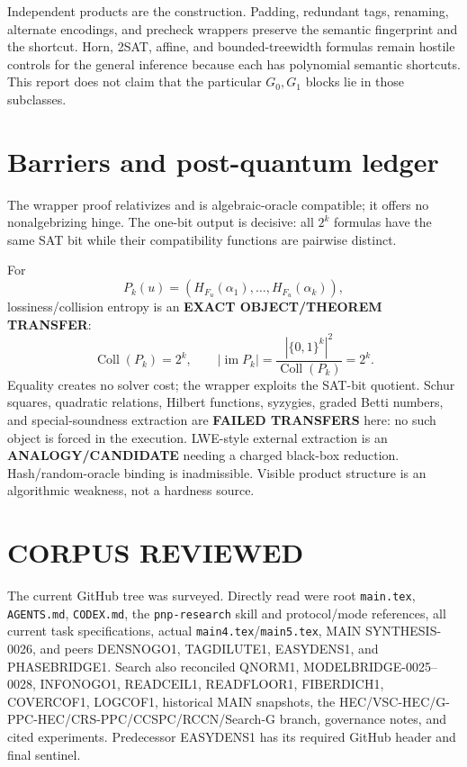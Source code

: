 \documentclass[11pt]{article}
\newcommand{\Status}[1]{\textbf{#1}}
\begin{document}
Independent products are the construction.  Padding, redundant tags,
renaming, alternate encodings, and precheck wrappers preserve the semantic
fingerprint and the shortcut.  Horn, 2SAT, affine, and bounded-treewidth
formulas remain hostile controls for the general inference because each has
polynomial semantic shortcuts.  This report does not claim that the particular
\(G_0,G_1\) blocks lie in those subclasses.

\section{Barriers and post-quantum ledger}
The wrapper proof relativizes and is algebraic-oracle compatible; it offers no
nonalgebrizing hinge.  The one-bit output is decisive: all \(2^k\) formulas
have the same SAT bit while their compatibility functions are pairwise
distinct.

For
\[
P_k(u)=(H_{F_u}(\alpha_1),\ldots,H_{F_u}(\alpha_k)),
\]
lossiness/collision entropy is an \Status{EXACT OBJECT/THEOREM TRANSFER}:
\[
\operatorname{Coll}(P_k)=2^k,\qquad
|\operatorname{im}P_k|=\frac{|\{0,1\}^k|^2}
{\operatorname{Coll}(P_k)}=2^k.                          \tag{10}
\]
Equality creates no solver cost; the wrapper exploits the SAT-bit quotient.
Schur squares, quadratic relations, Hilbert functions, syzygies, graded Betti
numbers, and special-soundness extraction are \Status{FAILED TRANSFERS} here:
no such object is forced in the execution.  LWE-style external extraction is
an \Status{ANALOGY/CANDIDATE} needing a charged black-box reduction.
Hash/random-oracle binding is inadmissible.  Visible product structure is an
algorithmic weakness, not a hardness source.

\section{CORPUS REVIEWED}
The current GitHub tree was surveyed.  Directly read were root
\texttt{main.tex}, \texttt{AGENTS.md}, \texttt{CODEX.md}, the
\texttt{pnp-research} skill and protocol/mode references, all current task
specifications, actual \texttt{main4.tex}/\texttt{main5.tex}, MAIN
SYNTHESIS-0026, and peers DENSNOGO1, TAGDILUTE1, EASYDENS1, and PHASEBRIDGE1.
Search also reconciled QNORM1, MODELBRIDGE-0025--0028, INFONOGO1, READCEIL1,
READFLOOR1, FIBERDICH1, COVERCOF1, LOGCOF1, historical MAIN snapshots, the
HEC/VSC-HEC/G-PPC-HEC/CRS-PPC/CCSPC/RCCN/Search-G branch, governance notes,
and cited experiments.  Predecessor EASYDENS1 has its required GitHub header
and final sentinel.
\end{document}
